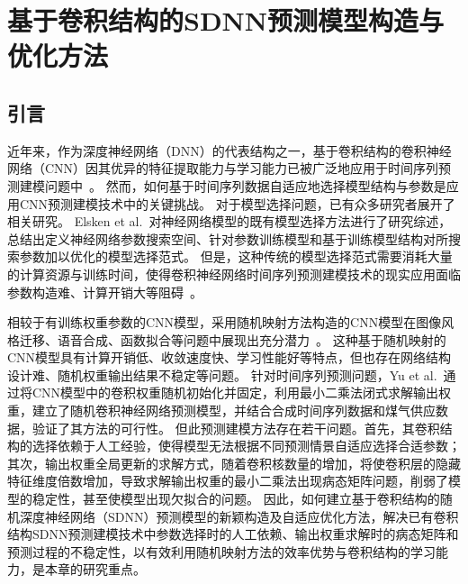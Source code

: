 
\chapter{基于卷积结构的SDNN预测模型构造与优化方法 \label{sec:chapter.cnn}
}


\section{引言}
近年来，作为深度神经网络（DNN）的代表结构之一，基于卷积结构的卷积神经网络（CNN）因其优异的特征提取能力与学习能力已被广泛地应用于时间序列预测建模问题中~\cite{sezer2018algorithmic,cavalliCNNbased2021,sadaei2019short}。
然而，如何基于时间序列数据自适应地选择模型结构与参数是应用CNN预测建模技术中的关键挑战。
对于模型选择问题，已有众多研究者展开了相关研究。
Elsken et al.~\cite{elskenNeural2019a}对神经网络模型的既有模型选择方法进行了研究综述，总结出定义神经网络参数搜索空间、针对参数训练模型和基于训练模型结构对所搜索参数加以优化的模型选择范式。
但是，这种传统的模型选择范式需要消耗大量的计算资源与训练时间，使得卷积神经网络时间序列预测建模技术的现实应用面临参数构造难、计算开销大等阻碍~\cite{zela2018towards}。

相较于有训练权重参数的CNN模型，采用随机映射方法构造的CNN模型在图像风格迁移、语音合成、函数拟合等问题中展现出充分潜力~\cite{hePowerful2016,antogniniAudio2019,yuImpact2019}。
这种基于随机映射的CNN模型具有计算开销低、收敛速度快、学习性能好等特点，但也存在网络结构设计难、随机权重输出结果不稳定等问题。
针对时间序列预测问题，Yu et al.~\cite{yuImpact2019}通过将CNN模型中的卷积权重随机初始化并固定，利用最小二乘法闭式求解输出权重，建立了随机卷积神经网络预测模型，并结合合成时间序列数据和煤气供应数据，验证了其方法的可行性。
但此预测建模方法存在若干问题。首先，其卷积结构的选择依赖于人工经验，使得模型无法根据不同预测情景自适应选择合适参数；其次，输出权重全局更新的求解方式，随着卷积核数量的增加，将使卷积层的隐藏特征维度倍数增加，导致求解输出权重的最小二乘法出现病态矩阵问题，削弱了模型的稳定性，甚至使模型出现欠拟合的问题。
因此，如何建立基于卷积结构的随机深度神经网络（SDNN）预测模型的新颖构造及自适应优化方法，解决已有卷积结构SDNN预测建模技术中参数选择时的人工依赖、输出权重求解时的病态矩阵和预测过程的不稳定性，以有效利用随机映射方法的效率优势与卷积结构的学习能力，是本章的研究重点。

